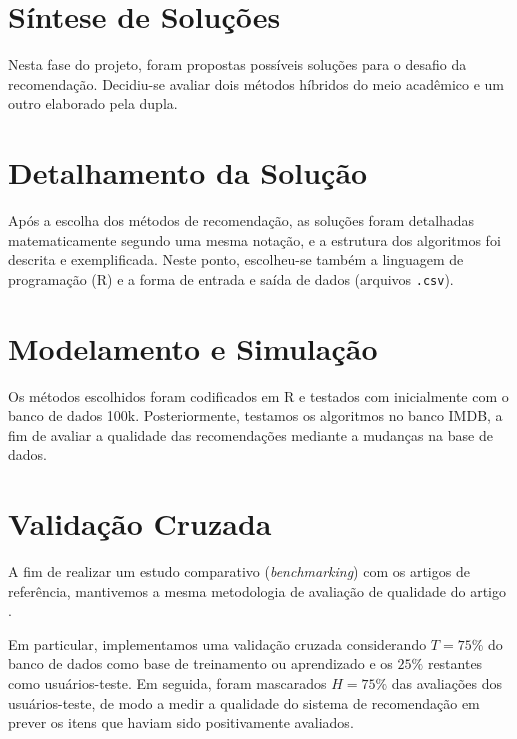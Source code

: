 \section{Síntese de Soluções} %
\label{sec:s_ntese_de_solu_es}


Nesta fase do projeto, foram propostas possíveis soluções para o desafio da recomendação. Decidiu-se avaliar dois métodos híbridos do meio acadêmico e um outro elaborado pela dupla. 

\section{Detalhamento da Solução} %
\label{sec:detalhamento_da_solu_o}


Após a escolha dos métodos de recomendação, as soluções foram detalhadas matematicamente segundo uma mesma notação, e a estrutura dos algoritmos foi descrita e exemplificada. Neste ponto, escolheu-se também a linguagem de programação (R) e a forma de entrada e saída de dados (arquivos \texttt{.csv}).

\section{Modelamento e Simulação} %
\label{sec:modelamento_e_simula_o}


Os métodos escolhidos foram codificados em R e testados com inicialmente com o banco de dados 100k. Posteriormente, testamos os algoritmos no banco IMDB, a fim de avaliar a qualidade das recomendações mediante a mudanças na base de dados.

\section{Validação Cruzada} %
\label{sec:prot_tipos_testes}

A fim de realizar um estudo comparativo (\textit{benchmarking}) com os artigos de referência, mantivemos a mesma metodologia de avaliação de qualidade do artigo .

Em particular, implementamos uma validação cruzada considerando $T=75\%$ do banco de dados como base de treinamento ou aprendizado e os $25\%$ restantes como usuários-teste. Em seguida, foram mascarados $H=75\%$ das avaliações dos usuários-teste, de modo a medir a qualidade do sistema de recomendação em prever os itens que haviam sido positivamente avaliados. 




